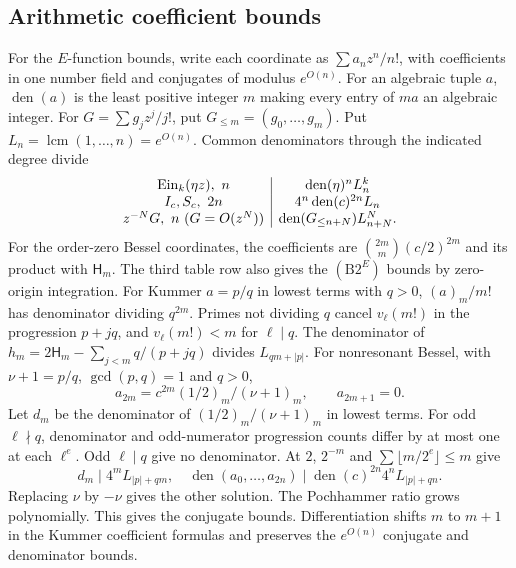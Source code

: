 \subsection{Arithmetic coefficient bounds}\label{app:arithmetic}
For the $E$-function bounds, write each coordinate as $\sum a_nz^n/n!$,
with coefficients in one number field and conjugates of modulus $e^{O(n)}$.
For an algebraic tuple $a$, $\operatorname{den}(a)$ is the least positive
integer $m$ making every entry of $ma$ an algebraic integer. For
$G=\sum g_jz^j/j!$, put $G_{\le m}=(g_0,\ldots,g_m)$.
Put $L_n=\operatorname{lcm}(1,\ldots,n)=e^{O(n)}$. Common denominators
through the indicated degree divide
\[
\begin{array}{c|c}
\operatorname{Ein}_k(\eta z),\ n&\operatorname{den}(\eta)^nL_n^k\\
I_c,S_c,\ 2n&4^n\operatorname{den}(c)^{2n}L_n\\
z^{-N}G,\ n\ (G=O(z^N))&\operatorname{den}(G_{\le n+N})L_{n+N}^N.
\end{array}
\]
For the order-zero Bessel coordinates, the coefficients are $\binom{2m}m(c/2)^{2m}$ and its product
with $\mathsf H_m$. The third table row also gives the $(\mathrm{B2}^E)$ bounds by zero-origin
integration. For Kummer $a=p/q$ in lowest terms with $q>0$, $(a)_m/m!$ has denominator dividing
$q^{2m}$. Primes not dividing $q$ cancel $v_\ell(m!)$ in the progression
$p+jq$, and $v_\ell(m!)<m$ for $\ell\mid q$. The denominator of
$h_m=2\mathsf H_m-\sum_{j<m}q/(p+jq)$ divides $L_{qm+|p|}$.
For nonresonant Bessel, with $\nu+1=p/q$, $\gcd(p,q)=1$ and $q>0$,
\begin{equation}\label{eq:bessel-normalized-coefficient}
a_{2m}=c^{2m}(1/2)_m/(\nu+1)_m,\qquad a_{2m+1}=0.
\end{equation}
Let $d_m$ be the denominator of $(1/2)_m/(\nu+1)_m$ in lowest terms.
For odd $\ell\nmid q$, denominator and odd-numerator progression counts
differ by at most one at each $\ell^e$. Odd $\ell\mid q$ give no denominator.
At $2$, $2^{-m}$ and $\sum\lfloor m/2^e\rfloor\le m$ give
\begin{equation}\label{eq:bessel-common-denominator}
d_m\mid4^mL_{|p|+qm},\quad
\operatorname{den}(a_0,\ldots,a_{2n})\mid
\operatorname{den}(c)^{2n}4^nL_{|p|+qn}.
\end{equation}
Replacing $\nu$ by $-\nu$ gives the other solution. The Pochhammer ratio grows polynomially. This gives the conjugate bounds. Differentiation shifts $m$ to $m+1$ in the Kummer coefficient formulas
and preserves the $e^{O(n)}$ conjugate and denominator bounds.

